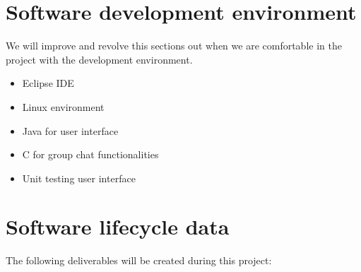\documentclass[a4paper]{article}
\begin{document}

\section{Software development environment}

We will improve and revolve this sections out when we are comfortable in the project with the development environment.

\begin{itemize}
	\item Eclipse IDE
	\item Linux environment
	\item Java for user interface
	\item C for group chat functionalities
	\item Unit testing user interface
\end{itemize}
\newpage


\section{Software lifecycle data}

The following deliverables will be created during this project:
\end{document}
